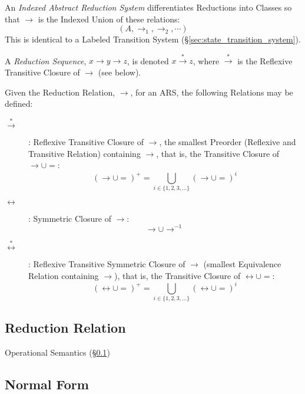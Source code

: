 An \emph{Indexed Abstract Reduction System} differentiates Reductions
into Classes so that $\rightarrow$ is the Indexed Union of these
relations:
\[
  (A, \rightarrow_1, \rightarrow_2, \cdots)
\]
This is identical to a Labeled Transition System
(\S\ref{sec:state_transition_system}).

A \emph{Reduction Sequence}, $x \rightarrow y \rightarrow z$, is
denoted $x \stackrel{*}\rightarrow z$, where $\stackrel{*}\rightarrow$
is the Reflexive Transitive Closure of $\rightarrow$ (see below).

Given the Reduction Relation, $\rightarrow$, for an ARS, the following
Relations may be defined:

\begin{description}

\item [$\stackrel{*}\rightarrow$]: Reflexive Transitive Closure of
  $\rightarrow$, the smallest Preorder (Reflexive and Transitive
  Relation) containing $\rightarrow$, that is, the Transitive Closure
  of $\rightarrow \cup =$:
  \[ (\rightarrow \cup =)^+ =
  \bigcup_{i \in \{1,2,3,...\}} (\rightarrow \cup =)^i \]

\item [$\leftrightarrow$]: Symmetric Closure of $\rightarrow$:
  \[ \rightarrow \cup \rightarrow^{-1} \]

\item [$\stackrel{*}\leftrightarrow$]: Reflexive Transitive
  Symmetric Closure of $\rightarrow$ (smallest Equivalence Relation
  containing $\rightarrow$), that is, the Transitive Closure of
  $\leftrightarrow \cup =$:
  \[ (\leftrightarrow \cup =)^+ =
  \bigcup_{i \in \{1,2,3,...\}} (\leftrightarrow \cup =)^i \]

\end{description}



\subsection{Reduction Relation}\label{sec:reduction_relation}

Operational Semantics (\S\ref{sec:reduction_relation})



\subsection{Normal Form}\label{sec:normal_form}

